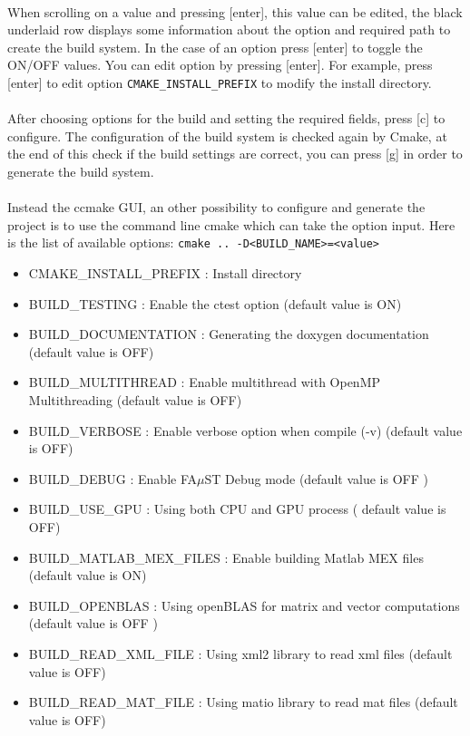 \paragraph{}When scrolling on a value and pressing [enter], this value can be edited, the black underlaid row displays some information about the option and required path to create the build system. In the case of an option press [enter] to toggle the ON/OFF values. You can edit option by pressing [enter]. For example, press [enter] to edit option \texttt{CMAKE\_INSTALL\_PREFIX} to modify the install directory. 
\paragraph{}After choosing options for the build and setting the required fields, press [c] to configure. The configuration of the build system is checked again by Cmake, at the end of this check if the build settings are correct, you can press [g] in order to generate the build system.

\paragraph{} Instead the ccmake GUI, an other possibility to configure and generate the project is to use the command line cmake which can take the option input. Here is the list of available options: 
\texttt{cmake\ ..\ -D<BUILD\_NAME>=<value>}

\begin{itemize}
\item CMAKE\_INSTALL\_PREFIX : Install directory
\item BUILD\_TESTING : Enable the ctest option (default value is ON)
\item BUILD\_DOCUMENTATION : Generating the doxygen documentation (default value is OFF)  
\item BUILD\_MULTITHREAD : Enable multithread with OpenMP Multithreading (default value is OFF)
\item BUILD\_VERBOSE : Enable verbose option when compile (-v) (default value is OFF)
\item BUILD\_DEBUG : Enable FA$\mu$ST Debug mode (default value is OFF )
\item BUILD\_USE\_GPU : Using both CPU and GPU process ( default value is OFF)
\item BUILD\_MATLAB\_MEX\_FILES : Enable building Matlab MEX files (default value is ON)
\item BUILD\_OPENBLAS : Using openBLAS for matrix and vector computations (default value is OFF )
\item BUILD\_READ\_XML\_FILE : Using xml2 library to read xml files (default value is OFF)
\item BUILD\_READ\_MAT\_FILE : Using matio library to read mat files (default value is OFF)
\end{itemize}

